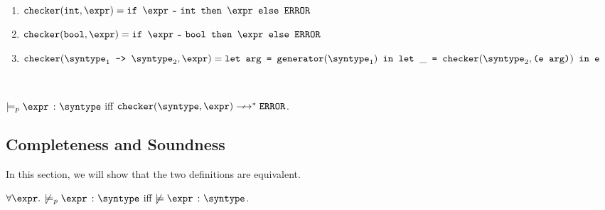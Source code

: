 \begin{definition}
  \label{def_checkCore}
  \ \par
  \begin{enumerate}
      \item $\mkche{\tint}{\expr} = \ife{\matches{\expr}{\tint}}{\expr}{\eerror}$
      \item $\mkche{\tbool}{\expr} = \ife{\matches{\expr}{\tbool}}{\expr}{\eerror}$
      \item $\mkche{\mkfun{\syntype_1}{\syntype_2}}{\expr} = \\
       \texttt{let arg = }\mkgen{\syntype_1} \texttt{ in }\letin{\_}{\mkche{\syntype_2}{\texttt{(e arg)}}}{\texttt{e}}$
   \end{enumerate}
\end{definition}

\begin{definition}
  \ \par
  $\models_p \hastype{\expr}{\syntype}$ iff $\mkche{\syntype}{\expr} \nsmallsteps[] \eerror$.
\end{definition}

\subsection{Completeness and Soundness}

In this section, we will show that the two definitions are equivalent.

\begin{theorem}
  $\forall \expr.$ $\not\models_p \hastype{\expr}{\syntype}$ iff $\not\models \hastype{\expr}{\syntype}$.
\end{theorem}

